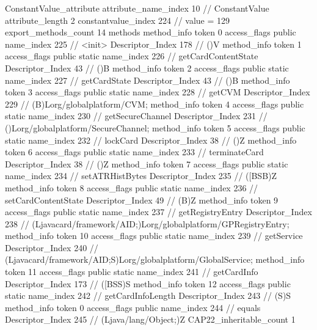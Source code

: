 {{{{{{				ConstantValue_attribute {
					attribute_name_index	10		// ConstantValue
					attribute_length	2
					constantvalue_index	224		// value = 129
				}
				}
			}
			}
			export_methods_count	14
			methods {
				method_info {
					token	0
					access_flags	public
					name_index	225		// <init>
					Descriptor_Index	178		// ()V
				}
				method_info {
					token	1
					access_flags	public static
					name_index	226		// getCardContentState
					Descriptor_Index	43		// ()B
				}
				method_info {
					token	2
					access_flags	public static
					name_index	227		// getCardState
					Descriptor_Index	43		// ()B
				}
				method_info {
					token	3
					access_flags	public static
					name_index	228		// getCVM
					Descriptor_Index	229		// (B)Lorg/globalplatform/CVM;
				}
				method_info {
					token	4
					access_flags	public static
					name_index	230		// getSecureChannel
					Descriptor_Index	231		// ()Lorg/globalplatform/SecureChannel;
				}
				method_info {
					token	5
					access_flags	public static
					name_index	232		// lockCard
					Descriptor_Index	38		// ()Z
				}
				method_info {
					token	6
					access_flags	public static
					name_index	233		// terminateCard
					Descriptor_Index	38		// ()Z
				}
				method_info {
					token	7
					access_flags	public static
					name_index	234		// setATRHistBytes
					Descriptor_Index	235		// ([BSB)Z
				}
				method_info {
					token	8
					access_flags	public static
					name_index	236		// setCardContentState
					Descriptor_Index	49		// (B)Z
				}
				method_info {
					token	9
					access_flags	public static
					name_index	237		// getRegistryEntry
					Descriptor_Index	238		// (Ljavacard/framework/AID;)Lorg/globalplatform/GPRegistryEntry;
				}
				method_info {
					token	10
					access_flags	public static
					name_index	239		// getService
					Descriptor_Index	240		// (Ljavacard/framework/AID;S)Lorg/globalplatform/GlobalService;
				}
				method_info {
					token	11
					access_flags	public static
					name_index	241		// getCardInfo
					Descriptor_Index	173		// ([BSS)S
				}
				method_info {
					token	12
					access_flags	public static
					name_index	242		// getCardInfoLength
					Descriptor_Index	243		// (S)S
				}
				method_info {
					token	0
					access_flags	public
					name_index	244		// equals
					Descriptor_Index	245		// (Ljava/lang/Object;)Z
				}
			}
			CAP22_inheritable_count	1
		}
	}
}
